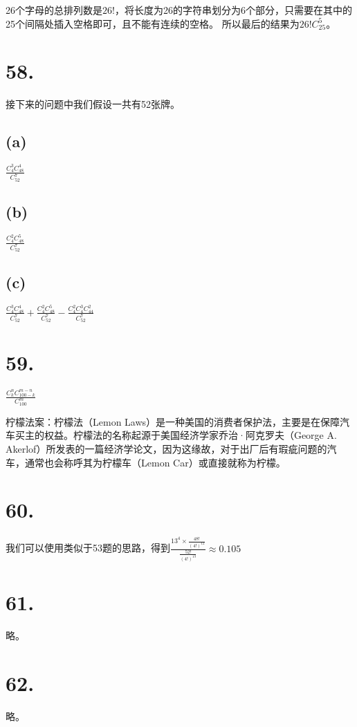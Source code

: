 \documentclass[UTF8]{report}
\begin{document}
        26个字母的总排列数是$26!$，将长度为26的字符串划分为6个部分，只需要在其中的25个间隔处插入空格即可，且不能有连续的空格。
        所以最后的结果为$26!C_{25}^5$。
    \section*{58.}
        接下来的问题中我们假设一共有52张牌。
        \subsection*{(a)}
            $\frac{C_4^3C_{48}^4}{C_{52}^7}$
        \subsection*{(b)}
            $\frac{C_4^2C_{48}^5}{C_{52}^7}$
        \subsection*{(c)}
            $\frac{C_4^3C_{48}^4}{C_{52}^7} + \frac{C_4^2C_{48}^5}{C_{52}^7} - \frac{C_4^2C_4^3C_{44}^2}{C_{52}^7}$
    \section*{59.}
        $\frac{C_k^nC_{100 - k}^{m - n}}{C_{100}^m}$

        柠檬法案：柠檬法（Lemon Laws）是一种美国的消费者保护法，主要是在保障汽车买主的权益。柠檬法的名称起源于美国经济学家乔治·阿克罗夫（George A. Akerlof）所发表的一篇经济学论文，因为这缘故，对于出厂后有瑕疵问题的汽车，通常也会称呼其为柠檬车（Lemon Car）或直接就称为柠檬。
    \section*{60.}
        我们可以使用类似于53题的思路，得到$\frac{13^4 \times \frac{48!}{(4!)^{12}}}{\frac{52!}{(4!)^{13}}} \approx 0.105$
    \section*{61.}
        略。
    \section*{62.}
        略。
\end{document}
